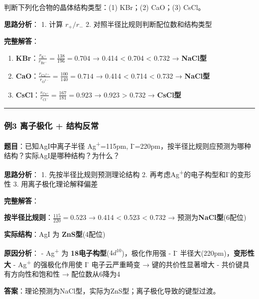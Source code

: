 判断下列化合物的晶体结构类型：(1) KBr；(2) CaO；(3) CsCl。

\textbf{思路分析}：
1. 计算 \(r_+/r_-\)
2. 对照半径比规则判断配位数和结构类型

\textbf{完整解答}：

\begin{enumerate}
\def\labelenumi{(\arabic{enumi})}
\item
  \textbf{KBr}：\(\frac{r_{\mathrm{K^+}}}{r_{\mathrm{Br^-}}} = \frac{138}{196} = 0.704\) → 0.414 \textless{} 0.704 \textless{} 0.732 → \textbf{NaCl型}
\item
  \textbf{CaO}：\(\frac{r_{\mathrm{Ca^{2+}}}}{r_{\mathrm{O^{2-}}}} = \frac{100}{140} = 0.714\) → 0.414 \textless{} 0.714 \textless{} 0.732 → \textbf{NaCl型}
\item
  \textbf{CsCl}：\(\frac{r_{\mathrm{Cs^+}}}{r_{\mathrm{Cl^-}}} = \frac{167}{181} = 0.923\) → 0.923 \textgreater{} 0.732 → \textbf{CsCl型}
\end{enumerate}

\begin{center}\rule{0.5\linewidth}{0.5pt}\end{center}

\subsubsection{例3 离子极化 + 结构反常}\label{ux4f8b3-ux79bbux5b50ux6781ux5316-ux7ed3ux6784ux53cdux5e38}

\textbf{题目}：已知AgI中离子半径 Ag\textsuperscript{+}=115pm, I\textsuperscript{-}=220pm，按半径比规则应预测为哪种结构？实际AgI是哪种结构？为什么？

\textbf{思路分析}：
1. 先按半径比规则预测理论结构
2. 再考虑Ag\textsuperscript{+}的电子构型和I\textsuperscript{-}的变形性
3. 用离子极化理论解释偏差

\textbf{完整解答}：

\textbf{按半径比规则}：\(\frac{115}{220} = 0.523\) → 0.414 \textless{} 0.523 \textless{} 0.732 → 预测为\textbf{NaCl型}(6配位)

\textbf{实际结构}：AgI 为 \textbf{ZnS型}(4配位)

\textbf{原因分析}：
- Ag\textsuperscript{+} 为 \textbf{18电子构型}(\(4d^{10}\))，极化作用强
- I\textsuperscript{-} 半径大(220pm)，\textbf{变形性大}
- Ag\textsuperscript{+} 的强极化作用使 I\textsuperscript{-} 电子云严重畸变 → 键的共价性显著增大
- 共价键具有方向性和饱和性 → 配位数从6降为4

\textbf{答案}：理论预测为NaCl型，实际为ZnS型；离子极化导致的键型过渡。

